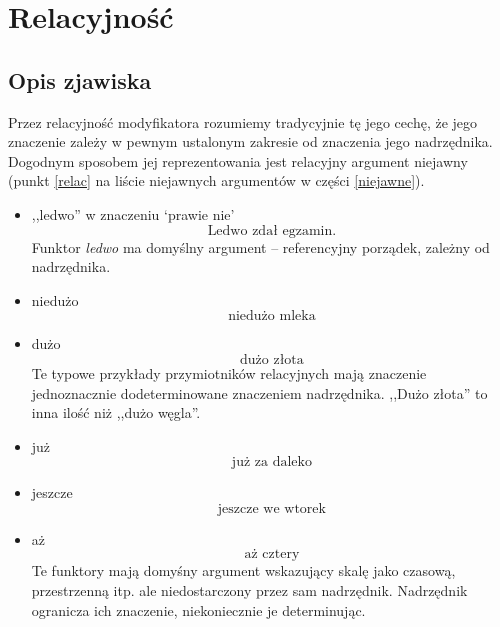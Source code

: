 \documentclass[a4paper, 12pt]{article}
\theoremstyle{remark}
\begin{document}
\section{Relacyjność}
{
\renewcommand\thesection{}
\renewcommand\thesubsection{}
\setcounter{subsection}{-1}
\subsection{Opis zjawiska} %
\label{sub:opis_zjawiska1}
}

Przez relacyjność modyfikatora rozumiemy tradycyjnie tę jego cechę, że jego znaczenie zależy w pewnym ustalonym zakresie od znaczenia jego nadrzędnika. Dogodnym sposobem jej reprezentowania jest relacyjny argument niejawny (punkt \ref{relac} na liście niejawnych argumentów w części \ref{niejawne}).

\begin{itemize}
\item ,,ledwo'' w znaczeniu `prawie nie'
\begin{equation}
	\text{Ledwo zdał egzamin}.
\end{equation}
Funktor \emph{ledwo} ma domyślny argument -- referencyjny porządek, zależny od nadrzędnika.
\item niedużo
\begin{equation}
	\text{niedużo mleka}
\end{equation}
\item dużo
\begin{equation}
	\text{dużo złota}
\end{equation}
Te typowe przykłady przymiotników relacyjnych mają znaczenie jednoznacznie dodeterminowane znaczeniem nadrzędnika. 
,,Dużo złota'' to inna ilość niż ,,dużo węgla''.
\item już
\begin{equation}
	\text{już za daleko}
\end{equation}
\item jeszcze
\begin{equation}
	\text{jeszcze we wtorek}
\end{equation}
\item aż
\begin{equation}
	\text{aż cztery}
\end{equation}
Te funktory mają domyśny argument wskazujący skalę jako czasową, przestrzenną itp. ale niedostarczony przez sam nadrzędnik.
Nadrzędnik ogranicza ich znaczenie, niekoniecznie je determinując. 
\end{itemize}
\end{document}
